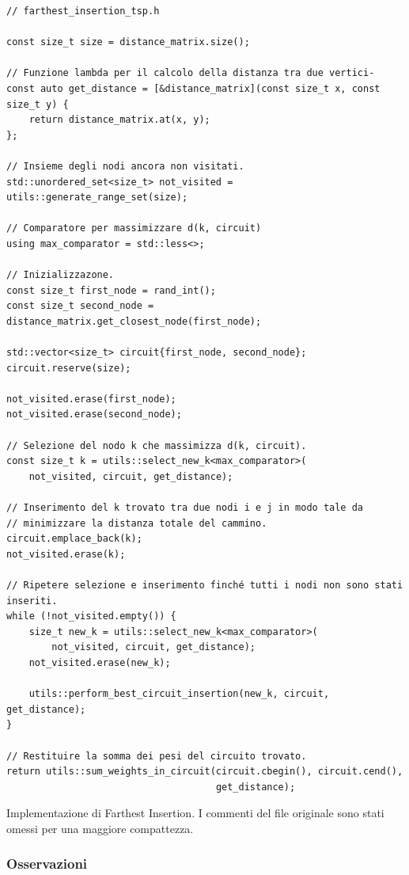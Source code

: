 \begin{listing}[!ht]
\begin{verbatim}
// farthest_insertion_tsp.h

const size_t size = distance_matrix.size();

// Funzione lambda per il calcolo della distanza tra due vertici-
const auto get_distance = [&distance_matrix](const size_t x, const size_t y) {
    return distance_matrix.at(x, y);
};

// Insieme degli nodi ancora non visitati.
std::unordered_set<size_t> not_visited = utils::generate_range_set(size);

// Comparatore per massimizzare d(k, circuit)
using max_comparator = std::less<>;

// Inizializzazone.
const size_t first_node = rand_int();
const size_t second_node = distance_matrix.get_closest_node(first_node);

std::vector<size_t> circuit{first_node, second_node};
circuit.reserve(size);

not_visited.erase(first_node);
not_visited.erase(second_node);

// Selezione del nodo k che massimizza d(k, circuit).
const size_t k = utils::select_new_k<max_comparator>(
    not_visited, circuit, get_distance);

// Inserimento del k trovato tra due nodi i e j in modo tale da
// minimizzare la distanza totale del cammino.
circuit.emplace_back(k);
not_visited.erase(k);

// Ripetere selezione e inserimento finché tutti i nodi non sono stati inseriti.
while (!not_visited.empty()) {
    size_t new_k = utils::select_new_k<max_comparator>(
        not_visited, circuit, get_distance);
    not_visited.erase(new_k);

    utils::perform_best_circuit_insertion(new_k, circuit, get_distance);
}

// Restituire la somma dei pesi del circuito trovato.
return utils::sum_weights_in_circuit(circuit.cbegin(), circuit.cend(), 
                                     get_distance);
\end{verbatim}
\caption{Implementazione di Farthest Insertion. I commenti del file originale sono stati omessi per una maggiore compattezza.}
\label{listing:farthest-insertion}
\end{listing}

\subsubsection{Osservazioni}

